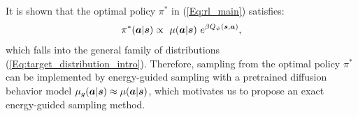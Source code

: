 It is shown that the optimal policy $\pi^*$ in (\ref{Eq:rl_main}) satisfies:
\begin{equation}
\label{Eq:pi_optimal}
    \pi^*({\bm{a}}|{\bm{s}}) \propto \ \mu({\bm{a}}|{\bm{s}}) \ e^{\beta Q_\psi({\bm{s}}, {\bm{a}})},
\end{equation}
which falls into the general family of distributions (\ref{Eq:target_distribution_intro}). Therefore, sampling from the optimal policy $\pi^*$ can be implemented by energy-guided sampling with a pretrained diffusion behavior model $\mu_g({\bm{a}}|{\bm{s}})\approx \mu({\bm{a}}|{\bm{s}})$, which motivates us to propose an exact energy-guided sampling method.














